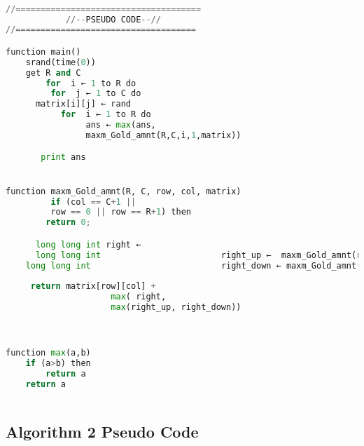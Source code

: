 \documentclass[conference]{IEEEtran}
\begin{document}
\begin{lstlisting}[caption=Algorithm 1, style=chstyle, language=python]

//=====================================
            //--PSEUDO CODE--//
//====================================

function main()
	srand(time(0))
	get R and C
	    for  i ← 1 to R do
		 for  j ← 1 to C do
      matrix[i][j] ← rand
           for  i ← 1 to R do
                ans ← max(ans,
                maxm_Gold_amnt(R,C,i,1,matrix))

       print ans


function maxm_Gold_amnt(R, C, row, col, matrix)
         if (col == C+1 || 
         row == 0 || row == R+1) then
		return 0;

      long long int right ← 						                       maxm_Gold_amnt(row,col+1)
      long long int  					   right_up ←  maxm_Gold_amnt(row-1,col+1)
	long long int 						   right_down ← maxm_Gold_amnt(row+1,col+1)
		
     return matrix[row][col] +
                     max( right, 
                     max(right_up, right_down))



function max(a,b)
	if (a>b) then
		return a
	return a



\end{lstlisting}



\subsection{Algorithm 2 Pseudo Code}\label{AA}
\end{document}
